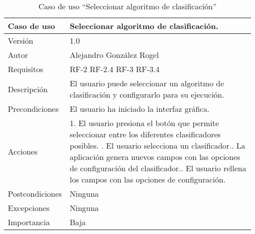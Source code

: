     \begin{table}
  \begin{center}
   \begin{tabular}{|>{} L{3cm} | L{9cm} |}
    \hline
    Caso de uso & Seleccionar algoritmo de clasificación.\\
    \hline
    Versión & 1.0 \\
    \hline
    Autor & Alejandro González Rogel \\
    \hline
    Requisitos & RF-2\newline
    				 RF-2.4\newline
    				 RF-3\newline
    				 RF-3.4 \\
    \hline
    Descripción & El usuario puede seleccionar un algoritmo de clasificación y configurarlo para su ejecución. \\
    \hline
    Precondiciones & El usuario ha iniciado la interfaz gráfica.\\
    \hline
    		Acciones & 1. El usuario presiona el botón que permite seleccionar entre los diferentes clasificadores posibles. . El usuario selecciona un clasificador.. La aplicación genera nuevos campos con las opciones de configuración del clasificador.. El usuario rellena los campos con las opciones de configuración.    \\ 			
    \hline
    Postcondiciones & Ninguna\\
    \hline
    Excepciones & Ninguna \\
    \hline
    Importancia & Baja \\
    \hline
   \end{tabular}
   \caption{Caso de uso ``Seleccionar algoritmo de clasificación''}
   \label{tabla:casoUso8}
  \end{center}
 \end{table}
 
